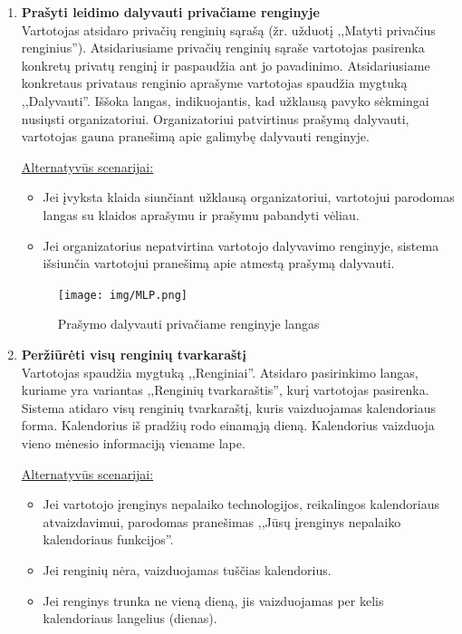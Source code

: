 \documentclass{VUMIFPSkursinis}
\begin{document}
\begin{enumerate} [label = \textbf{U\arabic*.}]
				\begin{figure}[H]
					\centering
					\texttt{[image: img/MLP.png]}
					\caption{Privačių renginių sąrašo langas}
					\label{fig:matyti-privacius-renginius}
				\end{figure}

			\item \textbf{Prašyti leidimo dalyvauti privačiame renginyje} \\
				Vartotojas atsidaro privačių renginių sąrašą (žr. užduotį ,,Matyti privačius renginius'').
				Atsidariusiame privačių renginių sąraše vartotojas pasirenka konkretų privatų renginį ir paspaudžia ant jo pavadinimo.
				Atsidariusiame konkretaus privataus renginio aprašyme vartotojas spaudžia mygtuką ,,Dalyvauti''.
				Iššoka langas, indikuojantis, kad užklausą pavyko sėkmingai nusiųsti organizatoriui.
				Organizatoriui patvirtinus prašymą dalyvauti, vartotojas gauna pranešimą apie galimybę dalyvauti renginyje.
				
				\underline{Alternatyvūs scenarijai:}
				\begin{itemize}
					\item Jei įvyksta klaida siunčiant užklausą organizatoriui, vartotojui parodomas langas su klaidos aprašymu ir prašymu pabandyti vėliau.
					\item Jei organizatorius nepatvirtina vartotojo dalyvavimo renginyje, sistema išsiunčia vartotojui pranešimą apie atmestą prašymą dalyvauti.
				\end{itemize}

				\begin{figure}[H]
					\centering
					\texttt{[image: img/MLP.png]}
					\caption{Prašymo dalyvauti privačiame renginyje langas}
					\label{fig:prasymas-dalyvauti-privaciame-renginyje}
				\end{figure}
				
			\item \textbf{Peržiūrėti visų renginių tvarkaraštį} \\
				Vartotojas spaudžia mygtuką ,,Renginiai''.
				Atsidaro pasirinkimo langas, kuriame yra variantas ,,Renginių tvarkaraštis'', kurį vartotojas pasirenka.
				Sistema atidaro visų renginių tvarkaraštį, kuris vaizduojamas kalendoriaus forma.
				Kalendorius iš pradžių rodo einamąją dieną.
				Kalendorius vaizduoja vieno mėnesio informaciją viename lape.
			
				\underline{Alternatyvūs scenarijai:}
				\begin{itemize}
					\item Jei vartotojo įrenginys nepalaiko technologijos, reikalingos kalendoriaus atvaizdavimui, parodomas pranešimas ,,Jūsų įrenginys nepalaiko kalendoriaus funkcijos''.
					\item Jei renginių nėra, vaizduojamas tuščias kalendorius.
					\item Jei renginys trunka ne vieną dieną, jis vaizduojamas per kelis kalendoriaus langelius (dienas).
				\end{itemize}


\end{enumerate}
\end{document}
